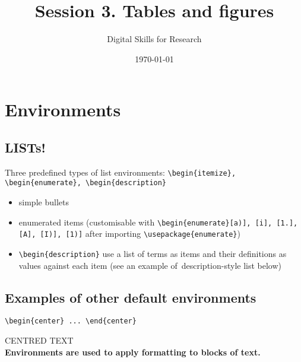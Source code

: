 \documentclass[a4paper,11pt]{article}
\title{Session 3. Tables and figures}
\author{Digital Skills for Research}
\date{\today}
\begin{document}
\clearpage\maketitle
\thispagestyle{empty}

\maketitle
\tableofcontents

\section{Environments}

\subsection{LISTs!}

Three predefined types of list environments: \verb|\begin{itemize}, \begin{enumerate}, \begin{description}|

\begin{itemize}
	\item simple bullets
	\item enumerated items (customisable with \verb|\begin{enumerate}[a)], [i], [1.], [A], [I)], [1)]| after importing \verb|\usepackage{enumerate}|)
	\item \verb|\begin{description}| use a list of terms as items and their definitions as values against each item (see an example of~\hypertarget{ex:descr}{description-style list} below)
\end{itemize}

\subsection{Examples of other default environments}

\verb|\begin{center} ... \end{center}|

\begin{center}
CENTRED TEXT\\
\textbf{Environments are used to apply formatting to blocks of text.}
\end{center}
\end{document}
